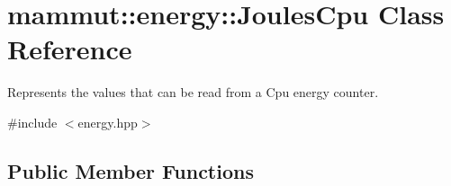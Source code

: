\hypertarget{classmammut_1_1energy_1_1JoulesCpu}{\section{mammut\-:\-:energy\-:\-:Joules\-Cpu Class Reference}
\label{classmammut_1_1energy_1_1JoulesCpu}
}


Represents the values that can be read from a Cpu energy counter.  




{\ttfamily \#include $<$energy.\-hpp$>$}

\subsection*{Public Member Functions}
